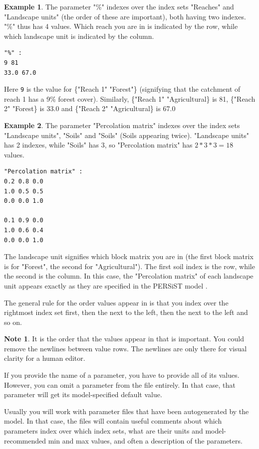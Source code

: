 \documentclass[11pt]{article}
\theoremstyle{definition}
\newtheorem{mynote}{Note}
\newenvironment{note}%
  {\begin{lrbox}{\notebox}%
   \begin{minipage}{\dimexpr\linewidth-2\fboxsep}
   \begin{mynote}}%
  {\end{mynote}%
   \end{minipage}%
   \end{lrbox}%
   \begin{trivlist}
     \item[]\colorbox{silver}{\usebox\notebox}
   \end{trivlist}}
\newtheorem{myexample}{Example}
\newenvironment{example}%
  {\begin{lrbox}{\examplebox}%
   \begin{minipage}{\dimexpr\linewidth-2\fboxsep}
   \begin{myexample}}%
  {\end{myexample}%
   \end{minipage}%
   \end{lrbox}%
   \begin{trivlist}
     \item[]\colorbox{silver}{\usebox\examplebox}
   \end{trivlist}}
\begin{document}
\begin{example}
The parameter "\%" indexes over the index sets "Reaches" and "Landscape units" (the order of these are important), both having two indexes. "\%" thus has 4 values. Which reach you are in is indicated by the row, while which landscape unit is indicated by the column.
\begin{lstlisting}
"%" :
9 81
33.0 67.0
\end{lstlisting}
Here {\tt 9} is the value for \{"Reach 1" "Forest"\} (signifying that the catchment of reach 1 has a 9\% forest cover). Similarly, \{"Reach 1" "Agricultural\} is 81, \{"Reach 2" "Forest\} is 33.0 and \{"Reach 2" "Agricultural\} is 67.0
\end{example}

\begin{example}
The parameter "Percolation matrix" indexes over the index sets "Landscape units", "Soils" and "Soils" (Soils appearing twice). "Landscape units" has 2 indexes, while "Soils" has 3, so "Percolation matrix" has $2*3*3=18$ values.
\begin{lstlisting}
"Percolation matrix" :
0.2 0.8 0.0
1.0 0.5 0.5
0.0 0.0 1.0

0.1 0.9 0.0
1.0 0.6 0.4
0.0 0.0 1.0
\end{lstlisting}
The landscape unit signifies which block matrix you are in (the first block matrix is for "Forest", the second for "Agricultural"). The first soil index is the row, while the second is the column. In this case, the "Percolation matrix" of each landscape unit appears exactly as they are specified in the PERSiST model \cite{futter14}.
\end{example}

The general rule for the order values appear in is that you index over the rightmost index set first, then the next to the left, then the next to the left and so on.

\begin{note}
It is the order that the values appear in that is important. You could remove the newlines between value rows. The newlines are only there for visual clarity for a human editor.
\end{note}

If you provide the name of a parameter, you have to provide all of its values. However, you can omit a parameter from the file entirely. In that case, that parameter will get its model-specified default value.

Usually you will work with parameter files that have been autogenerated by the model. In that case, the files will contain useful comments about which parameters index over which index sets, what are their units and model-recommended min and max values, and often a description of the parameters.
\end{document}
